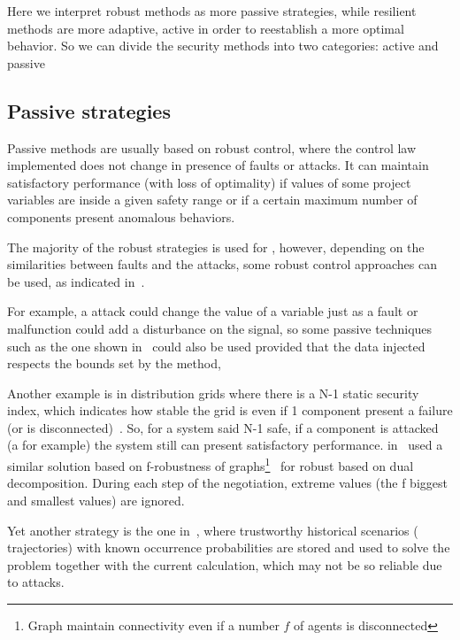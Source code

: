 \documentclass[../main.tex]{subfiles}
\begin{document}
Here we interpret robust methods as more passive strategies, while resilient methods are more adaptive, active in order to reestablish a more optimal behavior.
So we can divide the security methods into two categories: active and passive

\subsection{Passive strategies}\label{sec:protecting_against_attacks}
Passive methods are usually based on robust control, where the control law implemented does not change in presence of faults or attacks.
It can maintain satisfactory performance (with loss of optimality) if values of some project variables are inside a given safety range or if a certain maximum number of components present anomalous behaviors.

The majority of the robust strategies is used for \ftc{}, however, depending on the similarities between faults and the attacks, some robust control approaches can be used, as indicated in~\cite{TeixeiraEtAl2015,DingEtAl2018,ArauzEtAl2021}.

For example, a \fdi{} attack could change the value of a variable just as a fault or malfunction could add a disturbance on the signal, so some passive \ftc{} techniques such as the one shown in~\cite{VahidNaghaviEtAl2014} could also be used provided that the data injected respects the bounds set by the method,

Another example is in distribution grids where there is a N-1 static security index, which indicates how stable the grid is even if 1 component present a failure (or is disconnected)~\cite{QianEtAl2022}.
So, for a system said N-1 safe, if a component is attacked (a \DoS{} for example) the system still can present satisfactory performance.
\citeauthor{VelardeEtAl2018} in~\cite{VelardeEtAl2017b,VelardeEtAl2018} used a similar solution based on f-robustness of graphs\footnote{Graph maintain connectivity even if a number $f$ of agents is disconnected}~\cite{DibajiIshii2015,WangIshii2019} for robust \dmpc{} based on dual decomposition. During each step of the negotiation, extreme values (the f biggest and smallest values) are ignored.

Yet another strategy is the one in~\cite{VelardeEtAl2017a,MaestreEtAl2021}, where trustworthy historical scenarios (\mpc{} trajectories) with known occurrence probabilities are stored and used to solve the problem together with the current calculation, which may not be so reliable due to attacks.
\end{document}
